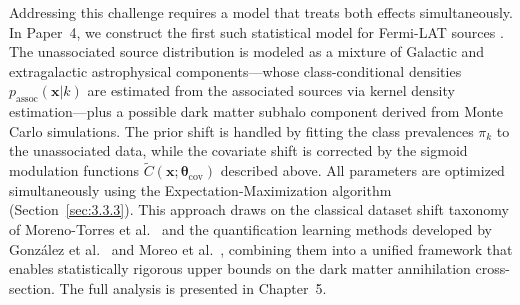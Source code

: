 Addressing this challenge requires a model that treats both effects simultaneously. In Paper~4, we construct the first such statistical model for Fermi-LAT sources \cite{Amerio:2025sub}. The unassociated source distribution is modeled as a mixture of Galactic and extragalactic astrophysical components---whose class-conditional densities $p_{\text{assoc}}(\mathbf{x}|k)$ are estimated from the associated sources via kernel density estimation---plus a possible dark matter subhalo component derived from Monte Carlo simulations. The prior shift is handled by fitting the class prevalences $\pi_k$ to the unassociated data, while the covariate shift is corrected by the sigmoid modulation functions $\tilde{C}(\mathbf{x};\boldsymbol{\theta}_{\text{cov}})$ described above. All parameters are optimized simultaneously using the Expectation-Maximization algorithm (Section~\ref{sec:3.3.3}). This approach draws on the classical dataset shift taxonomy of Moreno-Torres et al.~\cite{MorenoTorres:2012} and the quantification learning methods developed by Gonz\'alez et al.~\cite{Gonzalez:2017} and Moreo et al.~\cite{Moreo:2024}, combining them into a unified framework that enables statistically rigorous upper bounds on the dark matter annihilation cross-section. The full analysis is presented in Chapter~5.

